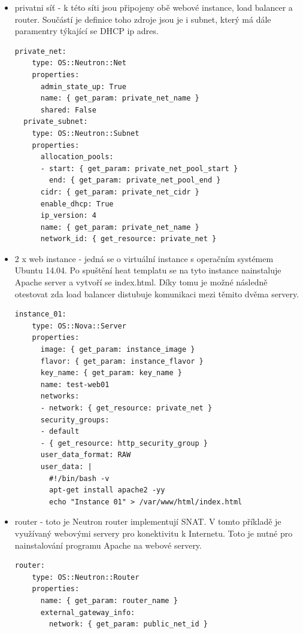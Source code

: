 \begin{itemize}
\item privatni síť - k této síti jsou připojeny obě webové instance, load balancer a router. Součástí je definice toho zdroje jsou je i subnet, který má dále paramentry týkající se DHCP ip adres.

\begin{lstlisting}[caption=Privátní síť a subnet]
private_net:
    type: OS::Neutron::Net
    properties:
      admin_state_up: True
      name: { get_param: private_net_name }
      shared: False
  private_subnet:
    type: OS::Neutron::Subnet
    properties:
      allocation_pools:
      - start: { get_param: private_net_pool_start }
        end: { get_param: private_net_pool_end }
      cidr: { get_param: private_net_cidr }
      enable_dhcp: True
      ip_version: 4
      name: { get_param: private_net_name }
      network_id: { get_resource: private_net }
\end{lstlisting}

\item 2 x web instance - jedná se o virtuální instance s operačním systémem Ubuntu 14.04. Po spuštění heat templatu se na tyto instance nainstaluje Apache server a vytvoří se index.html. Díky tomu je možné následně otestovat zda load balancer distubuje komunikaci mezi těmito dvěma servery.

\begin{lstlisting}[caption=Web server 1]
  instance_01:
    type: OS::Nova::Server
    properties:
      image: { get_param: instance_image }
      flavor: { get_param: instance_flavor }
      key_name: { get_param: key_name }
      name: test-web01
      networks:
      - network: { get_resource: private_net }
      security_groups:
      - default
      - { get_resource: http_security_group }
      user_data_format: RAW
      user_data: |
        #!/bin/bash -v
        apt-get install apache2 -yy
        echo "Instance 01" > /var/www/html/index.html
\end{lstlisting}


\item router - toto je Neutron router implementují SNAT. V tomto příkladě je využívaný webovými servery pro konektivitu k Internetu. Toto je nutné pro nainstalování programu Apache na webové servery.

\begin{lstlisting}[caption=Web server 1]
  router:
    type: OS::Neutron::Router
    properties:
      name: { get_param: router_name }
      external_gateway_info:
        network: { get_param: public_net_id }
\end{lstlisting}


\end{itemize}
